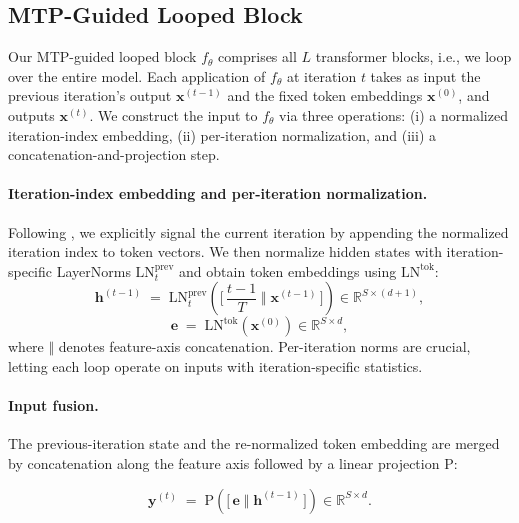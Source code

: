 \subsection{MTP-Guided Looped Block}
\label{sec:method:cond}
Our MTP-guided looped block $f_{\theta}$ comprises all $L$ transformer blocks, i.e., we loop over the entire model.
Each application of $f_\theta$ at iteration $t$ takes as input the previous
iteration's output $\mathbf{x}^{(t-1)}$ and the fixed token embeddings
$\mathbf{x}^{(0)}$, and outputs $\mathbf{x}^{(t)}$. We construct the
input to $f_\theta$ via three operations: (i) a normalized iteration-index
embedding, (ii) per-iteration normalization, and (iii) a concatenation-and-projection step.

\paragraph{Iteration-index embedding and per-iteration normalization.}
Following \citet{frey2026adaptive}, we explicitly signal the current iteration by appending the normalized iteration index to token vectors.
We then normalize hidden states with iteration-specific LayerNorms $\mathrm{LN}^{\text{prev}}_{t}$ and obtain token embeddings using
$\mathrm{LN}^{\text{tok}}$:
\begin{equation}
  \mathbf{h}^{(t-1)} \;{=}\; \mathrm{LN}^{\text{prev}}_{t}\!\left(\big[\, \frac{t{-}1}{T} \;\Vert\; \mathbf{x}^{(t-1)} \,\big]\right) {\in } \mathbb{R}^{S \times (d+1)}, 
\end{equation}
\begin{equation}
  \mathbf{e}   \;=\; \mathrm{LN}^{\text{tok}}\!\left(\mathbf{x}^{(0)}\right) \in \mathbb{R}^{S \times d},
\end{equation}
where $\Vert$ denotes feature-axis concatenation.
Per-iteration norms are crucial, letting each loop operate on inputs with iteration-specific statistics.

\paragraph{Input fusion.}
The previous-iteration state and the re-normalized token embedding are merged
by concatenation along the feature axis followed by a linear projection $\mathrm{P}$:

\begin{equation}
  \mathbf{y}^{(t)} \;=\; \mathrm{P}\!\left(\big[\, \mathbf{e} \;\Vert\; \mathbf{h}^{(t-1)} \,\big]\right) \in \mathbb{R}^{S \times d}.
\end{equation}

